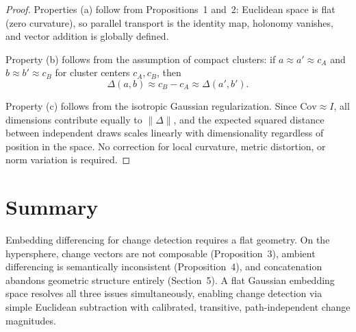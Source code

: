 \documentclass[12pt]{article}
\begin{document}
\begin{proof}
Properties (a) follow from Propositions~1 and~2: Euclidean space is flat (zero curvature), so parallel transport is the identity map, holonomy vanishes, and vector addition is globally defined.

Property (b) follows from the assumption of compact clusters: if $a \approx a' \approx c_A$ and $b \approx b' \approx c_B$ for cluster centers $c_A, c_B$, then
\[
    \Delta(a, b) \approx c_B - c_A \approx \Delta(a', b').
\]

Property (c) follows from the isotropic Gaussian regularization. Since $\mathrm{Cov} \approx I$, all dimensions contribute equally to $\|\Delta\|$, and the expected squared distance between independent draws scales linearly with dimensionality regardless of position in the space. No correction for local curvature, metric distortion, or norm variation is required.
\end{proof}

\section*{Summary}

Embedding differencing for change detection requires a flat geometry. On the hypersphere, change vectors are not composable (Proposition~3), ambient differencing is semantically inconsistent (Proposition~4), and concatenation abandons geometric structure entirely (Section~5). A flat Gaussian embedding space resolves all three issues simultaneously, enabling change detection via simple Euclidean subtraction with calibrated, transitive, path-independent change magnitudes.
\end{document}
